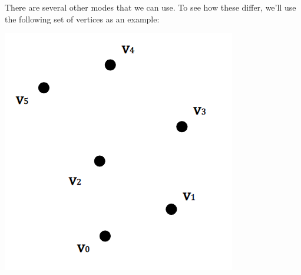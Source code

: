 \documentclass[letterpaper]{article}
\begin{document}
There are several other modes that we can use. To see how these differ, we'll use the following set of vertices as an example:
\begin{center}
    \includegraphics[scale=0.5]{../assets/points2.png}
\end{center}
\end{document}
